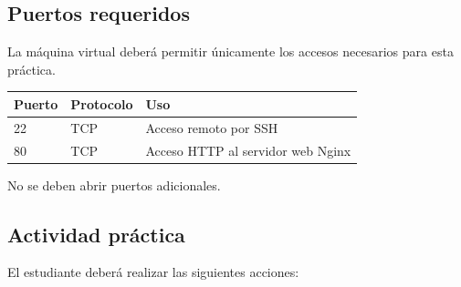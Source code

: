 \documentclass[
  coursetitle={Cómputo Nube y Tecnologías Emergentes},
  coursehours={96},
  coursedate={Verano 2026},
  doctype={Tarea 2},
  otherlangs={english,french},
  authorname={Lázaro},
  authorsurname={Bustio-Martínez},
  authortitle={PhD},
  role={Profesor Investigador},
  email={lbustio@inaoe.mx},
  phone={5559504000},
  ext={7459},
  institution={Instituto Nacional de Astrofísica, Óptica y Electrónica (INAOE)},
  department={Maestría en Ciencias en Tecnologías de Seguridad},
  address={Luis Enrique Erro 1, Sta. Ma. Tonantzintla, San Andrés Cholula, CP 72840, Puebla, México},
  margin={0.5in}
]{../../../lbustio_lecture_notes}
\begin{document}
\subsection{Puertos requeridos}
\label{sec:tarea2-puertos}

La máquina virtual deberá permitir únicamente los accesos necesarios para esta práctica.

\begin{center}
\begin{tabular}{|p{}|p{}|p{}|}
\hline
\textbf{Puerto} & \textbf{Protocolo} & \textbf{Uso} \\
\hline
22 & TCP & Acceso remoto por SSH \\
\hline
80 & TCP & Acceso HTTP al servidor web Nginx \\
\hline
\end{tabular}
\end{center}

No se deben abrir puertos adicionales.

\subsection{Actividad práctica}
\label{sec:tarea2-actividad}

El estudiante deberá realizar las siguientes acciones:
\end{document}
